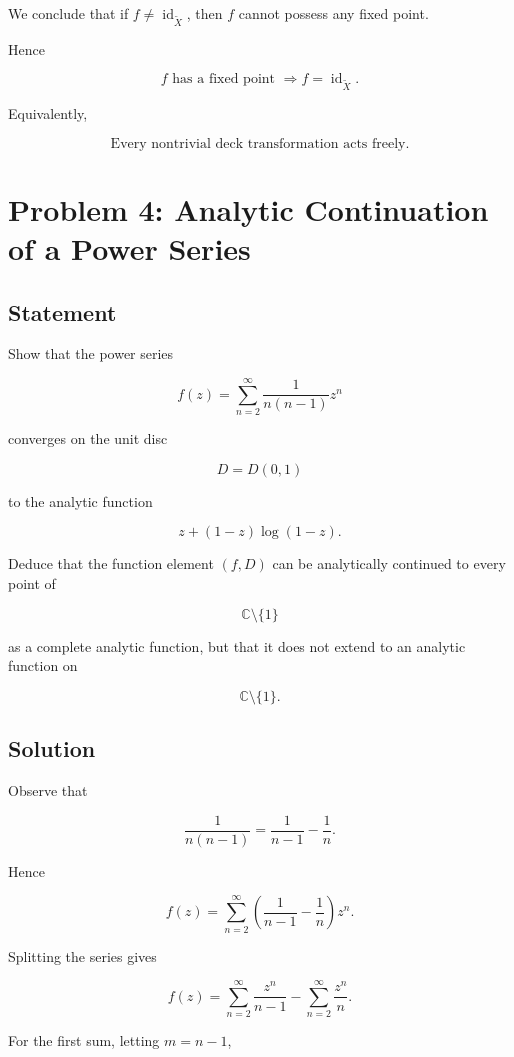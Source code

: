 \documentclass[12pt,a4paper]{article}
\theoremstyle{notespace}
\begin{document}
We conclude that if \(f\neq\operatorname{id}_{\widetilde X}\), then \(f\) cannot possess any fixed point.

Hence

\[
\boxed{
	f \text{ has a fixed point }
	\Longrightarrow
	f=\operatorname{id}_{\widetilde X}.
}
\]

Equivalently,

\[
\boxed{
	\text{Every nontrivial deck transformation acts freely.}
}
\]
	
\section{Problem 4: Analytic Continuation of a Power Series}

\subsection*{Statement}

Show that the power series

\[
f(z)=\sum_{n=2}^{\infty}\frac{1}{n(n-1)}z^n
\]

converges on the unit disc

\[
D=D(0,1)
\]

to the analytic function

\[
z+(1-z)\log(1-z).
\]

Deduce that the function element \((f,D)\) can be analytically continued to every point of

\[
\mathbb C\setminus\{1\}
\]

as a complete analytic function, but that it does not extend to an analytic function on

\[
\mathbb C\setminus\{1\}.
\]

\subsection*{Solution}

Observe that

\[
\frac{1}{n(n-1)}
=
\frac{1}{n-1}-\frac{1}{n}.
\]

Hence

\[
f(z)
=
\sum_{n=2}^{\infty}
\left(
\frac{1}{n-1}
-
\frac{1}{n}
\right)z^n.
\]

Splitting the series gives

\[
f(z)
=
\sum_{n=2}^{\infty}\frac{z^n}{n-1}
-
\sum_{n=2}^{\infty}\frac{z^n}{n}.
\]

For the first sum, letting \(m=n-1\),
\end{document}
